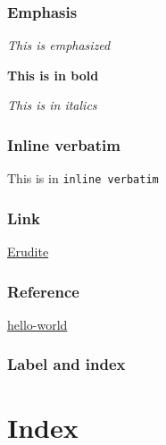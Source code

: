 \documentclass[11pt,pdflatex,makeidx]{scrbook}   %
\begin{document}
\subsection{Emphasis}
\emph{This is emphasized}

\textbf{This is in bold}

\textit{This is in italics}
\subsection{Inline verbatim}
This is in \verb|inline verbatim|
\subsection{Link}
\href{https://github.com/mmontone/erudite}{Erudite}
\subsection{Reference}
\hyperref[hello-world]{hello-world}
\subsection{Label and index}
\label{label-test}
\chapter{Index}
\printindex
\end{document}

